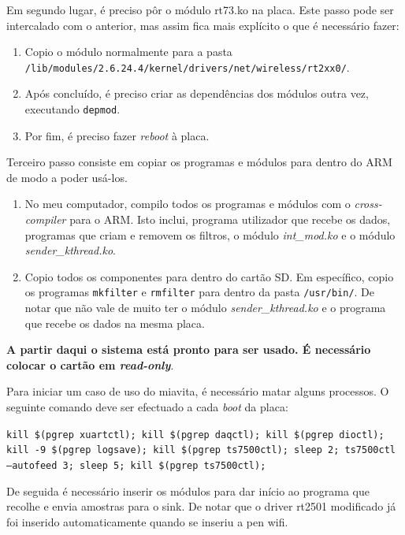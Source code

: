 \documentclass[10pt,a4paper,oneside]{book}
\begin{document}
	Em segundo lugar, é preciso pôr o módulo rt73.ko na placa. Este passo pode ser intercalado com o anterior, mas assim fica mais explícito o que é necessário fazer:
	
	\begin{enumerate}
		\item Copio o módulo normalmente para a pasta\\
		 {\tt /lib/modules/2.6.24.4/kernel/drivers/net/wireless/rt2xx0/}.
		\item Após concluído, é preciso criar as dependências dos módulos outra vez, executando {\tt depmod}.
		\item Por fim, é preciso fazer \emph{reboot} à placa.
	\end{enumerate}
	
	Terceiro passo consiste em copiar os programas e módulos para dentro do ARM de modo a poder usá-los.

	\begin{enumerate}
		\item No meu computador, compilo todos os programas e módulos com o \emph{cross-compiler} para o ARM. Isto inclui, programa utilizador que recebe os dados, programas que criam e removem os filtros, o módulo \emph{int\_mod.ko} e o módulo \emph{sender\_kthread.ko}.
		\item Copio todos os componentes para dentro do cartão SD. Em específico, copio os programas {\tt mkfilter} e {\tt rmfilter} para dentro da pasta {\tt /usr/bin/}. De notar que não vale de muito ter o módulo \emph{sender\_kthread.ko} e o programa que recebe os dados na mesma placa.
	\end{enumerate}
	
	\textbf{A partir daqui o sistema está pronto para ser usado. É necessário colocar o cartão em \emph{read-only}}.
	
	Para iniciar um caso de uso do miavita, é necessário matar alguns processos. O seguinte comando deve ser efectuado a cada \emph{boot} da placa:
	
	\begin{center}
		{\tt kill \$(pgrep xuartctl); kill \$(pgrep daqctl);  kill \$(pgrep dioctl); kill -9 \$(pgrep logsave); kill \$(pgrep ts7500ctl); sleep 2; ts7500ctl --autofeed 3; sleep 5; kill \$(pgrep ts7500ctl);}
	\end{center}
	
	De seguida é necessário inserir os módulos para dar início ao programa que recolhe e envia amostras para o sink. De notar que o driver rt2501 modificado já foi inserido automaticamente quando se inseriu a pen wifi.
	
\end{document}
